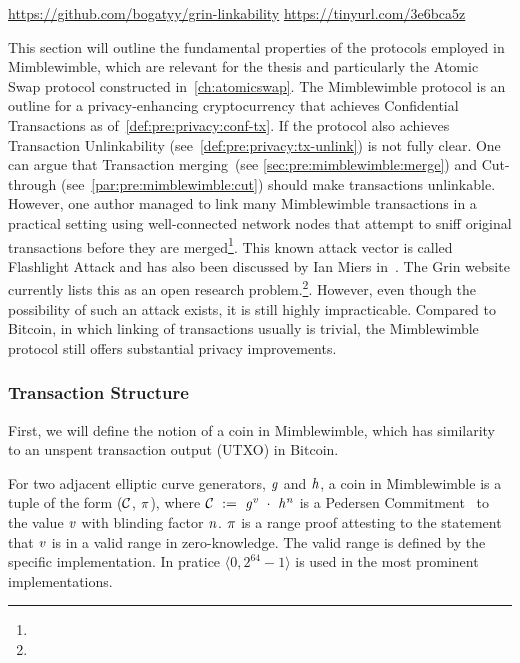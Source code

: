 \urldef\urlmwbreak\url{https://github.com/bogatyy/grin-linkability}
\urldef\urlmwresearch\url{https://tinyurl.com/3e6bca5z}

This section will outline the fundamental properties of the protocols employed in Mimblewimble, which are relevant for the thesis and particularly the Atomic Swap protocol constructed in~\cref{ch:atomicswap}.
The Mimblewimble protocol is an outline for a privacy-enhancing cryptocurrency that achieves Confidential Transactions as of~\cref{def:pre:privacy:conf-tx}.
If the protocol also achieves Transaction Unlinkability (see~\cref{def:pre:privacy:tx-unlink}) is not fully clear.
One can argue that Transaction merging~(see \cref{sec:pre:mimblewimble:merge}) and Cut-through (see~\cref{par:pre:mimblewimble:cut}) should make transactions unlinkable.
However, one author managed to link many Mimblewimble transactions in a practical setting using well-connected network nodes that attempt to sniff original transactions before they are merged\footnote{\urlmwbreak}.
This known attack vector is called Flashlight Attack and has also been discussed by Ian Miers in~\cite{miers2019blockchain}.
The Grin website currently lists this as an open research problem.\footnote{\urlmwresearch}.
However, even though the possibility of such an attack exists, it is still highly impracticable.
Compared to Bitcoin, in which linking of transactions usually is trivial, the Mimblewimble protocol still offers substantial privacy improvements.

\subsubsection{Transaction Structure} \label{subsec:pre:mimblwimble-tx}

First, we will define the notion of a coin in Mimblewimble, which has similarity to an unspent transaction output (UTXO) in Bitcoin.
\begin{definition}\label{def:pre:coin}
    For two adjacent elliptic curve generators, $\mathit{g}$ and $\mathit{h}$, a coin in Mimblewimble is a tuple of the form ($\mathcal{C}$, $\pi$), where $\mathcal{C} ~:=~ \mathit{g}^{\mathit{v}} ~\cdot~ \mathit{h}^{\mathit{n}}$ is a Pedersen Commitment~\cite{pedersen1991non}
    to the value $\mathit{v}$ with blinding factor $\mathit{n}$. $\pi$ is a range proof attesting to the statement that $\mathit{v}$ is in a valid range in zero-knowledge.
    The valid range is defined by the specific implementation.
In pratice $\langle 0, 2^{64} -1 \rangle$ is used in the most prominent implementations.
\end{definition}

